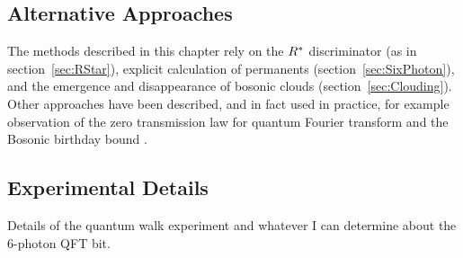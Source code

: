 \subsection{Alternative Approaches}
\label{sec:QCVAlternatives}
The methods described in this chapter rely on the \(R^{*}\) discriminator (as
in section~\ref{sec:RStar}), explicit calculation of permanents
(section~\ref{sec:SixPhoton}), and the emergence and disappearance of bosonic
clouds (section~\ref{sec:Clouding}). Other approaches have been described, and
in fact used in practice, for example observation of the zero transmission law
for quantum Fourier transform \cite{ztl, tichy-verification} and the Bosonic
birthday bound \cite{birthdays, experimental-birthdays}.

\subsection{Experimental Details}
\label{sec:VerificationExperiment}
Details of the quantum walk experiment and whatever I can determine about the
6-photon QFT bit.
